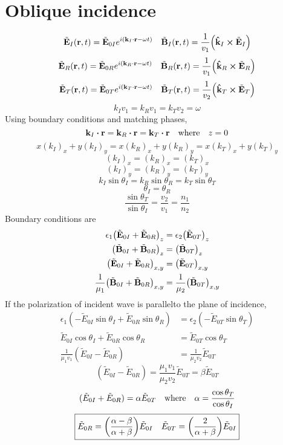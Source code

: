 \section*{Oblique incidence}
\[\tilde{\vb{E}}_I(\vb{r},t)=\tilde{\vb{E}}_{0I}e^{i(\vb{k}_I\cdot\vb{r}-\omega t)}\quad \tilde{\vb{B}}_I(\vb{r},t)=\frac{1}{v_1}\qty(\vu{k}_I\cp\tilde{\vb{E}}_I)\]
\[\tilde{\vb{E}}_R(\vb{r},t)=\tilde{\vb{E}}_{0R}e^{i(\vb{k}_R\cdot\vb{r}-\omega t)}\quad \tilde{\vb{B}}_R(\vb{r},t)=\frac{1}{v_1}\qty(\vu{k}_R\cp\tilde{\vb{E}}_R)\]
\[\tilde{\vb{E}}_T(\vb{r},t)=\tilde{\vb{E}}_{0T}e^{i(\vb{k}_T\cdot\vb{r}-\omega t)}\quad \tilde{\vb{B}}_T(\vb{r},t)=\frac{1}{v_2}\qty(\vu{k}_T\cp\tilde{\vb{E}}_T)\]
\[k_Iv_1=k_Rv_1=k_Tv_2=\omega\]
Using boundary conditions and matching phases,
\[\vb{k}_I\vdot\vb{r}=\vb{k}_R\vdot\vb{r}=\vb{k}_T\vdot\vb{r}\qq{where} z=0\]
\[x(k_I)_x+y(k_I)_y=x(k_R)_x+y(k_R)_y=x(k_T)_x+y(k_T)_y\]
\[(k_I)_x=(k_R)_x=(k_T)_x\]
\[(k_I)_y=(k_R)_y=(k_T)_y\]
\[k_I\sin\theta_I=k_R\sin\theta_R=k_T\sin\theta_T\]
\[\theta_I=\theta_R\]
\[\frac{\sin\theta_T}{\sin\theta_I}=\frac{v_2}{v_1}=\frac{n_1}{n_2}\]
Boundary conditions are 
\begin{align*}
\epsilon_1\qty(\tilde{\vb{E}}_{0I}+\tilde{\vb{E}}_{0R})_z&=\epsilon_2\qty(\tilde{\vb{E}}_{0T})_z\\
\qty(\tilde{\vb{B}}_{0I}+\tilde{\vb{B}}_{0R})_z&=\qty(\tilde{\vb{B}}_{0T})_z\\
\qty(\tilde{\vb{E}}_{0I}+\tilde{\vb{E}}_{0R})_{x,y}&=\qty(\tilde{\vb{E}}_{0T})_{x,y}\\
\frac{1}{\mu_1}\qty(\tilde{\vb{B}}_{0I}+\tilde{\vb{B}}_{0R})_{x,y}&=\frac{1}{\mu_2}\qty(\tilde{\vb{B}}_{0T})_{x,y}
\end{align*}
If the polarization of incident wave is parallelto the plane of incidence,
\begin{align*}
\epsilon_1(-\tilde{E}_{0I}\sin\theta_I+\tilde{E}_{0R}\sin\theta_R)&=\epsilon_2(-\tilde{E}_{0T}\sin\theta_T)\\
\tilde{E}_{0I}\cos\theta_I+\tilde{E}_{0R}\cos\theta_R&=
\tilde{E}_{0T}\cos\theta_T\\
\frac{1}{\mu_1v_1}(\tilde{E}_{0I}-\tilde{E}_{0R})&=\frac{1}{\mu_2v_2}\tilde{E}_{0T}
\end{align*}
\[(\tilde{E}_{0I}-\tilde{E}_{0R})=\frac{\mu_1v_1}{\mu_2v_2}\tilde{E}_{0T}=\beta\tilde{E}_{0T}\]
\[(\tilde{E}_{0I}+\tilde{E}_{0R})=\alpha\tilde{E}_{0T}\qq{where}\alpha=\frac{\cos\theta_T}{\cos\theta_I}\]
\[\boxed{\tilde{E}_{0R}=\qty(\frac{\alpha-\beta}{\alpha+\beta})\tilde{E}_{0I}\quad\tilde{E}_{0T}=\qty(\frac{2}{\alpha+\beta})\tilde{E}_{0I}}\]
